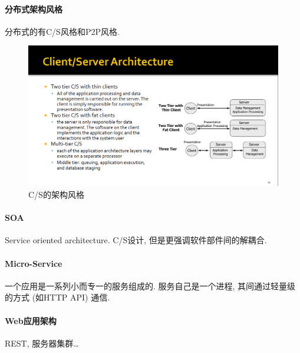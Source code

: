 \documentclass{ctexart}
\begin{document}
\paragraph{分布式架构风格}
    分布式的有C/S风格和P2P风格.
    \begin{figure}[ht!]
        \centering
        \includegraphics[width=\textwidth, height=\textheight, keepaspectratio]{csarch.png}
        \caption{C/S的架构风格}
    \end{figure}
\paragraph{SOA} Service oriented architecture. C/S设计, 但是更强调软件部件间的解耦合.
\paragraph{Micro-Service} 一个应用是一系列小而专一的服务组成的. 服务自己是一个进程,
    其间通过轻量级的方式 (如HTTP API) 通信. 
\paragraph{Web应用架构} REST, 服务器集群\ldots
\end{document}
